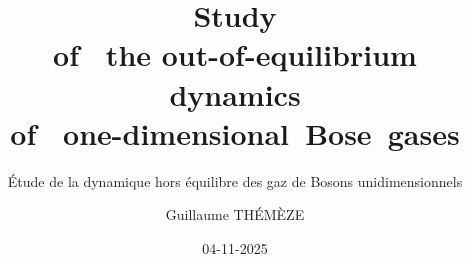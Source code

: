 





\title{Study \\ 
       of ~the out-of-equilibrium dynamics \\
       of~ \mbox{one-dimensional Bose gases}}
\subtitle{Étude de la dynamique hors équilibre des gaz de Bosons unidimensionnels}
\event{}
\date{04-11-2025}
\author{Guillaume THÉMÈZE}
